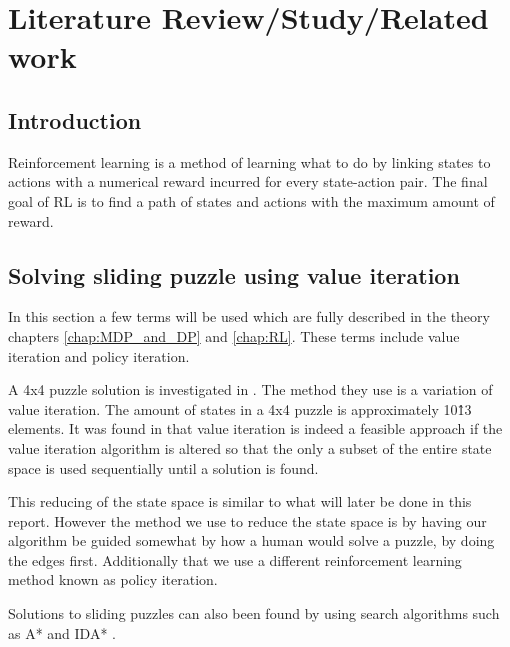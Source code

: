 \graphicspath{{Literature\_Review/fig}}
\chapter{Literature Review/Study/Related work}
\label{chap:Literature_Review}

\section{Introduction}
Reinforcement learning is a method of learning what to do by linking states to actions with a numerical reward incurred for every state-action pair. The final goal of RL is to find a path of states and actions with the maximum amount of reward. \cite{sutton_barto}

\section{Solving sliding puzzle using value iteration}
In this section a few terms will be used which are fully described in the theory chapters \ref{chap:MDP_and_DP} and \ref{chap:RL}. These terms include value iteration and policy iteration.

A 4x4 puzzle solution is investigated in \cite{15-puzzle_value_iteration}.
The method they use is a variation of value iteration. The amount of states in a 4x4 puzzle is approximately 10\^13 elements.
It was found in \cite{15-puzzle_value_iteration} that value iteration is indeed a feasible approach if the value iteration algorithm is altered so that the only a subset of the entire state space is used sequentially until a solution is found. 

This reducing of the state space is similar to what will later be done in this report. However the method we use to reduce the state space is by having our algorithm be guided somewhat by how a human would solve a puzzle, by doing the edges first. Additionally that we use a different reinforcement learning method known as policy iteration.


Solutions to sliding puzzles can also been found by using search algorithms such as A* and IDA*
\cite{search_alg}.
